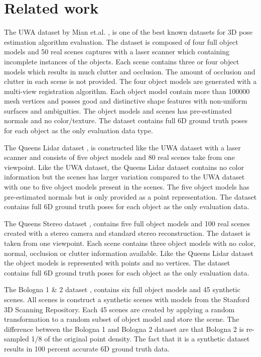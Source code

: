 \documentclass[10pt,twocolumn,letterpaper]{article}
\begin{document}
\section{Related work}
The UWA dataset by Mian et.al. \cite{Mian2006}, \cite{Mian2010} is one of the best known datasets for 3D pose estimation algorithm evaluation. The dataset is composed of four full object models and 50 real scenes captures with a laser scanner which containing incomplete instances of the objects. Each scene contains three or four object models which results in much clutter and occlusion. The amount of occlusion and clutter in each scene is not provided. The four object models are generated with a multi-view registration algorithm. Each object model contain more than 100000 mesh vertices and posses good and distinctive shape features with non-uniform surfaces and ambiguities. The object models and scenes has pre-estimated normals and no color/texture. The dataset contains full 6D ground truth poses for each object as the only evaluation data type.

The Queens Lidar dataset \cite{Taati2011}, \cite{Taati2007} is constructed like the UWA dataset with a laser scanner and consists of five object models and 80 real scenes take from one viewpoint. Like the UWA dataset, the Queens Lidar dataset contains no color information but the scenes has larger variation compared to the UWA dataset with one to five object models present in the scenes. The five object models has pre-estimated normals but is only provided as a point representation. The dataset contains full 6D ground truth poses for each object as the only evaluation data.

The Queens Stereo dataset \cite{Taati2011}, \cite{Taati2007} contains five full object models and 100 real scenes created with a stereo camera and standard stereo reconstruction. The dataset is taken from one viewpoint. Each scene contains three object models with no color, normal, occlusion or clutter information available. Like the Queens Lidar dataset the object models is represented with points and no vertices. The dataset contains full 6D ground truth poses for each object as the only evaluation data.

The Bologna 1 \& 2 dataset \cite{Salti2014}, \cite{Tombari2010} contains six full object models and 45 synthetic scenes. All scenes is construct a synthetic scenes with models from the Stanford 3D Scanning Repository. Each 45 scenes are created by applying a random transformation to a random subset of object model and store the scene. The difference between the Bologna 1 and Bologna 2 dataset are that Bologna 2 is re-sampled 1/8 of the original point density. The fact that it is a synthetic dataset results in 100 percent accurate 6D ground truth data.
\end{document}
